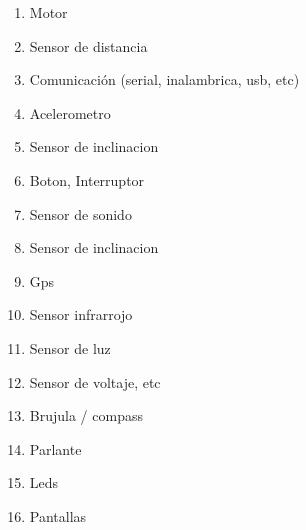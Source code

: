 \begin {enumerate}
  \item Motor
  \item Sensor de distancia
  \item Comunicación (serial, inalambrica, usb, etc)
  \item Acelerometro
  \item Sensor de inclinacion
  \item Boton, Interruptor
  \item Sensor de sonido
  \item Sensor de inclinacion
  \item Gps
  \item Sensor infrarrojo
  \item Sensor de luz
  \item Sensor de voltaje, etc
  \item Brujula / compass
  \item Parlante
  \item Leds
  \item Pantallas
\end {enumerate}



